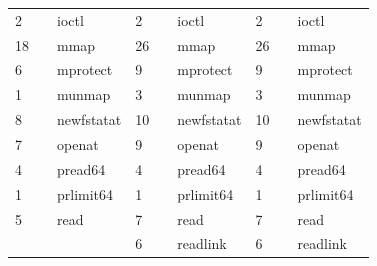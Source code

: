 \documentclass[submit,techreq,noauthor]{eco}	%
\begin{document}
\begin{table}[t]
\begin{tabular}{|lll|lll|lll|}
  \multicolumn{1}{|l|}{2}     & \multicolumn{1}{l|}{}       & ioctl             & \multicolumn{1}{l|}{2}     & \multicolumn{1}{l|}{}       & ioctl             & \multicolumn{1}{l|}{2}     & \multicolumn{1}{l|}{}       & ioctl             \\
  \multicolumn{1}{|l|}{18}    & \multicolumn{1}{l|}{}       & mmap              & \multicolumn{1}{l|}{26}    & \multicolumn{1}{l|}{}       & mmap              & \multicolumn{1}{l|}{26}    & \multicolumn{1}{l|}{}       & mmap              \\
  \multicolumn{1}{|l|}{6}     & \multicolumn{1}{l|}{}       & mprotect          & \multicolumn{1}{l|}{9}     & \multicolumn{1}{l|}{}       & mprotect          & \multicolumn{1}{l|}{9}     & \multicolumn{1}{l|}{}       & mprotect          \\
  \multicolumn{1}{|l|}{1}     & \multicolumn{1}{l|}{}       & munmap            & \multicolumn{1}{l|}{3}     & \multicolumn{1}{l|}{}       & munmap            & \multicolumn{1}{l|}{3}     & \multicolumn{1}{l|}{}       & munmap            \\
  \multicolumn{1}{|l|}{8}     & \multicolumn{1}{l|}{}       & newfstatat        & \multicolumn{1}{l|}{10}    & \multicolumn{1}{l|}{}       & newfstatat        & \multicolumn{1}{l|}{10}    & \multicolumn{1}{l|}{}       & newfstatat        \\
  \multicolumn{1}{|l|}{7}     & \multicolumn{1}{l|}{}       & openat            & \multicolumn{1}{l|}{9}     & \multicolumn{1}{l|}{}       & openat            & \multicolumn{1}{l|}{9}     & \multicolumn{1}{l|}{}       & openat            \\
  \multicolumn{1}{|l|}{4}     & \multicolumn{1}{l|}{}       & pread64           & \multicolumn{1}{l|}{4}     & \multicolumn{1}{l|}{}       & pread64           & \multicolumn{1}{l|}{4}     & \multicolumn{1}{l|}{}       & pread64           \\
  \multicolumn{1}{|l|}{1}     & \multicolumn{1}{l|}{}       & prlimit64         & \multicolumn{1}{l|}{1}     & \multicolumn{1}{l|}{}       & prlimit64         & \multicolumn{1}{l|}{1}     & \multicolumn{1}{l|}{}       & prlimit64         \\
  \multicolumn{1}{|l|}{5}     & \multicolumn{1}{l|}{}       & read              & \multicolumn{1}{l|}{7}     & \multicolumn{1}{l|}{}       & read              & \multicolumn{1}{l|}{7}     & \multicolumn{1}{l|}{}       & read              \\
  \multicolumn{1}{|l|}{}      & \multicolumn{1}{l|}{}       &                   & \multicolumn{1}{l|}{6}     & \multicolumn{1}{l|}{}       & readlink          & \multicolumn{1}{l|}{6}     & \multicolumn{1}{l|}{}       & readlink          \\

\end{tabular}
\end{table}
\end{document}
